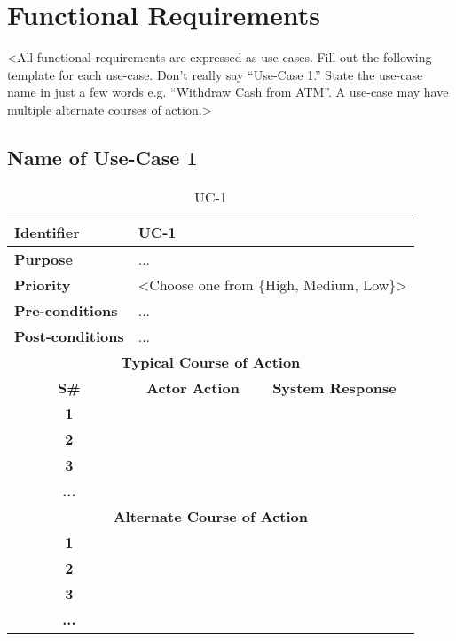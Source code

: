 \section{Functional Requirements}
<All functional requirements are expressed as use-cases. Fill out the following template for each use-case. Don’t really say “Use-Case 1.” State the use-case name in just a few words e.g. “Withdraw Cash from ATM”. A use-case may have multiple alternate courses of action.>

\subsection{Name of Use-Case 1}
\begin{table}[htb]
\centering
\caption{UC-1}
\begin{tabular}{|cll|}
\hline
\multicolumn{1}{|l|}{\textbf{Identifier}}      & \multicolumn{2}{l|}{UC-1} \\ \hline
\multicolumn{1}{|l|}{\textbf{Purpose}}         & \multicolumn{2}{l|}{...}  \\ \hline
\multicolumn{1}{|l|}{\textbf{Priority}} & \multicolumn{2}{l|}{\textless{}Choose one from \{High, Medium, Low\}\textgreater{}}        \\ \hline
\multicolumn{1}{|l|}{\textbf{Pre-conditions}}  & \multicolumn{2}{l|}{...}  \\ \hline
\multicolumn{1}{|l|}{\textbf{Post-conditions}} & \multicolumn{2}{l|}{...}  \\ \hline
\multicolumn{3}{|c|}{\textbf{Typical Course of Action}}                    \\ \hline
\multicolumn{1}{|c|}{\textbf{S\#}}      & \multicolumn{1}{c|}{\textbf{Actor Action}} & \multicolumn{1}{c|}{\textbf{System Response}} \\ \hline
\multicolumn{1}{|c|}{\textbf{1}}               & \multicolumn{1}{l|}{}  &  \\ \hline
\multicolumn{1}{|c|}{\textbf{2}}               & \multicolumn{1}{l|}{}  &  \\ \hline
\multicolumn{1}{|c|}{\textbf{3}}               & \multicolumn{1}{l|}{}  &  \\ \hline
\multicolumn{1}{|c|}{\textbf{...}}             & \multicolumn{1}{l|}{}  &  \\ \hline
\multicolumn{3}{|c|}{\textbf{Alternate Course of Action}}                  \\ \hline
\multicolumn{1}{|c|}{\textbf{1}}               & \multicolumn{1}{l|}{}  &  \\ \hline
\multicolumn{1}{|c|}{\textbf{2}}               & \multicolumn{1}{l|}{}  &  \\ \hline
\multicolumn{1}{|c|}{\textbf{3}}               & \multicolumn{1}{l|}{}  &  \\ \hline
\multicolumn{1}{|c|}{\textbf{...}}             & \multicolumn{1}{l|}{}  &  \\ \hline
\end{tabular}
\label{tbl:table21}
\end{table}
